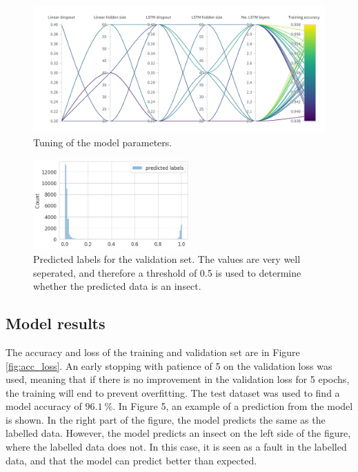\begin{figure}[htb]
  \centering
  \includegraphics[width=\textwidth]{Figures/model_tuning}
  \caption{Tuning of the model parameters.}
  \label{fig:tune-network}
\end{figure}

\begin{figure}[htb]
\begin{minipage}[b]{0.48\textwidth}
  \centering
  \includegraphics[width=6.0cm]{Figures/predicted_labels}
\end{minipage}
\caption{Predicted labels for the validation set. The values are very well seperated, and therefore a threshold of 0.5 is used to determine whether the predicted data is an insect.}
\label{fig:threshold}
\end{figure}

\subsection{Model results}
The accuracy and loss of the training and validation set are in Figure \ref{fig:acc_loss}. An early stopping with patience of 5 on the validation loss was used, meaning that if there is no improvement in the validation loss for 5 epochs, the training will end to prevent overfitting. The test dataset was used to find a model accuracy of $96.1 \: \%$. In Figure 5, an example of a prediction from the model is shown. In the right part of the figure, the model predicts the same as the labelled data. However, the model predicts an insect on the left side of the figure, where the labelled data does not. In this case, it is seen as a fault in the labelled data, and that the model can predict better than expected.


